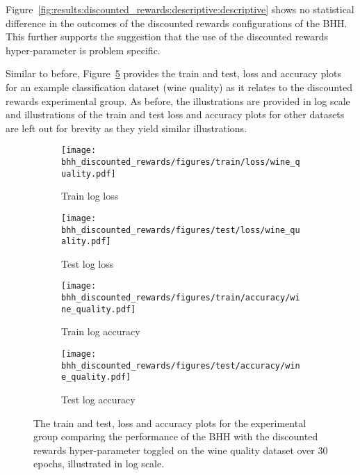 Figure~\ref{fig:results:discounted_rewards:descriptive:descriptive} shows no statistical difference in the outcomes of the discounted rewards configurations of the \acs{BHH}. This further supports the suggestion that the use of the discounted rewards hyper-parameter is problem specific.

Similar to before, Figure~\ref{fig:results:discounted_rewards:figures:wine_quality} provides the train and test, loss and accuracy plots for an example classification dataset (wine quality) as it relates to the discounted rewards experimental group. As before, the illustrations are provided in log scale and illustrations of the train and test loss and accuracy plots for other datasets are left out for brevity as they yield similar illustrations.

\begin{figure}[htb]
	\begin{subfigure}{0.5\textwidth}
		\centering
		\texttt{[image: bhh\_discounted\_rewards/figures/train/loss/wine\_quality.pdf]}
		\caption{Train log loss}
		\label{fig:results:discounted_rewards:figures:loss:train:wine_quality}
	\end{subfigure}
	\begin{subfigure}{0.5\textwidth}
		\centering
		\texttt{[image: bhh\_discounted\_rewards/figures/test/loss/wine\_quality.pdf]}
		\caption{Test log loss}
		\label{fig:results:discounted_rewards:figures:loss:test:wine_quality}
	\end{subfigure}
	\par\bigskip
	\begin{subfigure}{0.5\textwidth}
		\centering
		\texttt{[image: bhh\_discounted\_rewards/figures/train/accuracy/wine\_quality.pdf]}
		\caption{Train log accuracy}
		\label{fig:results:discounted_rewards:figures:accuracy:train:wine_quality}
	\end{subfigure}
	\begin{subfigure}{0.5\textwidth}
		\centering
		\texttt{[image: bhh\_discounted\_rewards/figures/test/accuracy/wine\_quality.pdf]}
		\caption{Test log accuracy}
		\label{fig:results:discounted_rewards:figures:accuracy:test:wine_quality}
	\end{subfigure}
	\par\bigskip
	\caption{The train and test, loss and accuracy plots for the experimental group comparing the performance of the \acs{BHH} with the discounted rewards hyper-parameter toggled on the wine quality dataset over 30 epochs, illustrated in log scale.}
	\label{fig:results:discounted_rewards:figures:wine_quality}
\end{figure}

